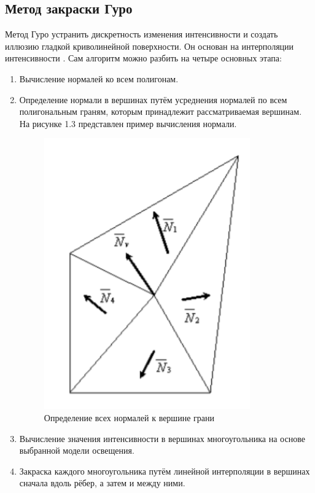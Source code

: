 \subsection{Метод закраски Гуро}
Метод Гуро устранить дискретность изменения интенсивности и создать иллюзию гладкой криволинейной поверхности. 
Он основан на интерполяции интенсивности \cite{cul}.
Сам алгоритм можно разбить на четыре основных этапа:
\begin{enumerate}
	\item Вычисление нормалей ко всем полигонам.
	\item Определение нормали в вершинах путём усреднения нормалей по всем полигональным граням, которым принадлежит рассматриваемая вершинам.
	На рисунке 1.3 представлен пример вычисления нормали.
	\FloatBarrier
	\begin{figure}[h]
		\begin{center}
			\includegraphics[]{inc/guro.png}
		\end{center}
		\caption{Определение всех нормалей к вершине грани}
	\end{figure}
	\FloatBarrier
	\item Вычисление значения интенсивности в вершинах многоугольника на основе выбранной модели освещения.
	\item Закраска каждого многоугольника путём линейной интерполяции в вершинах сначала вдоль рёбер, а затем и между ними.
\end{enumerate}

